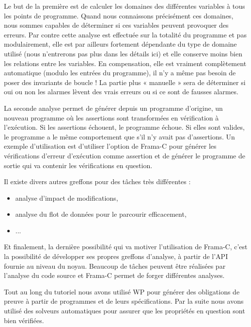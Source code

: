 Le but de la première est de calculer les domaines des différentes variables à
tous les points de programme. Quand nous connaissons précisément ces domaines,
nous sommes capables de déterminer si ces variables peuvent provoquer des erreurs.
Par contre cette analyse est effectuée sur la totalité du programme et pas 
modulairement, elle est par ailleurs fortement dépendante du type de domaine 
utilisé (nous n'entrerons pas plus dans les détails ici) et elle conserve moins
bien les relations entre les variables. En compensation, elle est vraiment 
complètement automatique (modulo les entrées du programme), il n'y a même pas
besoin de poser des invariants de boucle ! La partie plus « manuelle » sera de
déterminer si oui ou non les alarmes lèvent des vrais erreurs ou si ce sont de
fausses alarmes.



La seconde analyse permet de générer depuis un programme d'origine, un nouveau
programme où les assertions sont transformées en vérification à l'exécution. Si
les assertions échouent, le programme échoue. Si elles sont valides, le programme
a le même comportement que s'il n'y avait pas d'assertions. Un exemple 
d'utilisation est d'utiliser l'option  de Frama-C pour générer les 
vérifications d'erreur d'exécution comme assertion et de générer le programme de 
sortie qui va contenir les vérifications en question.



Il existe divers autres greffons pour des tâches très différentes :



\begin{itemize}
\item analyse d'impact de modifications,
\item analyse du flot de données pour le parcourir efficacement,
\item ...
\end{itemize}


Et finalement, la dernière possibilité qui va motiver l'utilisation de Frama-C,
c'est la possibilité de développer ses propres greffons d'analyse, à partir de
l'API fournie au niveau du noyau. Beaucoup de tâches peuvent être réalisées par
l'analyse du code source et Frama-C permet de forger différentes analyses.





Tout au long du tutoriel nous avons utilisé WP pour générer des obligations de 
preuve à partir de programmes et de leurs spécifications. Par la suite nous avons
utilisé des solveurs automatiques pour assurer que les propriétés en question sont
bien vérifiées.



